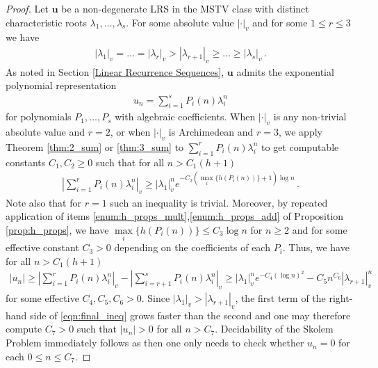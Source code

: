 \documentclass{theoretics}
\newcommand{\LRS}[1]{{\bm{#1}}}
\begin{document}
\begin{proof}
Let $\LRS{u}$ be a non-degenerate LRS in the MSTV class with distinct characteristic roots $\lambda_1, \dots , \lambda_s$. For some absolute value $|\cdot|_v$ and for some $1 \leq r \leq 3$ we have 
\begin{align*}
|\lambda_1|_v = \dots = |\lambda_r|_v > |\lambda_{r+1}|_v \geq \dots \geq |\lambda_s|_v \, .
\end{align*}
As noted in Section \ref{Linear Recurrence Sequences}, $\LRS{u}$ admits the exponential polynomial representation
\begin{align}\label{Exp_sum}
    u_n = \sum_{i=1}^s P_i(n) \lambda_i^n 
\end{align}
for polynomials $P_1, \dots , P_s$ with algebraic coefficients. When $|\cdot|_v$ is any non-trivial absolute value and $r = 2$, or when $|\cdot|_v$ is Archimedean and $r=3$, we apply Theorem \ref{thm:2_sum} or \ref{thm:3_sum} to $\sum_{i=1}^r P_i(n) \lambda_i^n$ to get computable constants $C_1,C_2 \geq 0$ such that for all $n > C_1(h+1)$
\begin{align*}
\left| \sum_{i=1}^r P_i(n) \lambda_i^n \right|_v \geq |\lambda_1|_v^n e^{-C_2 \left(\underset{i} \max \{h(P_i(n))\} + 1 \right) \log n} \, .
\end{align*}
Note also that for $r=1$ such an inequality is trivial. Moreover, by repeated application of items \ref{enum:h_props_mult},\ref{enum:h_props_add} of Proposition \ref{prop:h_props}, we have $\underset{i}{\max} \{h(P_i(n))\} \leq C_3 \log n$ for $n\geq 2$ and for some effective constant $C_3 >0$ depending on the coefficients of each $P_i$. Thus, we have for all $n > C_1(h+1)$
\begin{align} \label{eqn:final_ineq}
|u_n| \geq \left| \sum_{i=1}^r P_i(n) \lambda_i^n \right|_v - \left| \sum_{i=r+1}^s P_i(n) \lambda_i^n \right|_v \geq |\lambda_1|_v^n e^{-C_4 (\log n)^2} - C_5 n^{C_6}|\lambda_{r+1}|_v^n
\end{align}
for some effective $C_4,C_5,C_6 > 0$. Since $|\lambda_1|_v > |\lambda_{r+1}|_v$, the first term of the right-hand side of \eqref{eqn:final_ineq} grows faster than the second and one may therefore compute $C_7 >0$ such that $|u_n| > 0$ for all $n > C_7$. Decidability of the Skolem Problem immediately follows as then one only needs to check whether $u_n = 0$ for each $0 \leq n \leq C_7$.
\end{proof}
\end{document}

